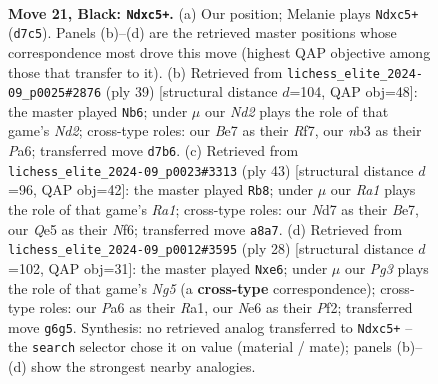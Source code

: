 \documentclass[11pt]{article}
\begin{document}
\clearpage

\begin{figure}[p]\centering
\begin{subfigure}{0.46\textwidth}\centering
\resizebox{\linewidth}{!}{%
\newchessgame
\chessboard[
  setfen={r1b2kr1/1p1nbp1p/p3n1p1/2Ppq3/8/1N1KBPN1/PP4PP/1R1Q1B1R b - - 2 21},
  showmover=false,
  pgfstyle=straightmove, color=movearrow, markmove={d7-c5}
]}
\caption{}
\end{subfigure}\hfill
\begin{subfigure}{0.46\textwidth}\centering
\resizebox{\linewidth}{!}{%
\newchessgame
\chessboard[
  setfen={r1b3k1/1p1nnrp1/p3p2p/3pP2P/3P3N/4Q2R/Pq2N1P1/4RBK1 b - - 0 20},
  showmover=false,
  pgfstyle=straightmove, color=movearrow, markmove={d7-b6}
]}
\caption{}
\end{subfigure}
\\[4pt]
\begin{subfigure}{0.46\textwidth}\centering
\resizebox{\linewidth}{!}{%
\newchessgame
\chessboard[
  setfen={r1b2rk1/4bpp1/p4n1p/1p2p3/4B2R/PNN1qP2/1PQ3PP/1K5R b - - 1 22},
  showmover=false,
  pgfstyle=straightmove, color=movearrow, markmove={a8-b8}
]}
\caption{}
\end{subfigure}\hfill
\begin{subfigure}{0.46\textwidth}\centering
\resizebox{\linewidth}{!}{%
\newchessgame
\chessboard[
  setfen={r2qkb1r/1p4pp/p1n1p1b1/3pn1N1/5Q2/2N1B2P/PPP2PP1/R4RK1 w kq - 0 15},
  showmover=false,
  pgfstyle=straightmove, color=movearrow, markmove={g5-e6}
]}
\caption{}
\end{subfigure}
\caption{\textbf{Move 21, Black: \texttt{Ndxc5+}.} (a) Our position; Melanie plays \texttt{Ndxc5+} (\texttt{d7c5}). Panels (b)--(d) are the retrieved master positions whose correspondence most drove this move (highest QAP objective among those that transfer to it). (b) Retrieved from \texttt{lichess\_elite\_2024-09\_p0025\#2876} (ply 39) [structural distance $d$=104, QAP obj=48]: the master played \texttt{Nb6}; under $\mu$ our \emph{Nd2} plays the role of that game's \emph{Nd2}; cross-type roles: our \emph{B}e7 as their \emph{R}f7, our \emph{n}b3 as their \emph{P}a6; transferred move \texttt{d7b6}. (c) Retrieved from \texttt{lichess\_elite\_2024-09\_p0023\#3313} (ply 43) [structural distance $d$=96, QAP obj=42]: the master played \texttt{Rb8}; under $\mu$ our \emph{Ra1} plays the role of that game's \emph{Ra1}; cross-type roles: our \emph{N}d7 as their \emph{B}e7, our \emph{Q}e5 as their \emph{N}f6; transferred move \texttt{a8a7}. (d) Retrieved from \texttt{lichess\_elite\_2024-09\_p0012\#3595} (ply 28) [structural distance $d$=102, QAP obj=31]: the master played \texttt{Nxe6}; under $\mu$ our \emph{Pg3} plays the role of that game's \emph{Ng5} (a \textbf{cross-type} correspondence); cross-type roles: our \emph{P}a6 as their \emph{R}a1, our \emph{N}e6 as their \emph{P}f2; transferred move \texttt{g6g5}. Synthesis: no retrieved analog transferred to \texttt{Ndxc5+} -- the \texttt{search} selector chose it on value (material / mate); panels (b)--(d) show the strongest nearby analogies.}
\label{fig:thought-m41}
\end{figure}
\end{document}
